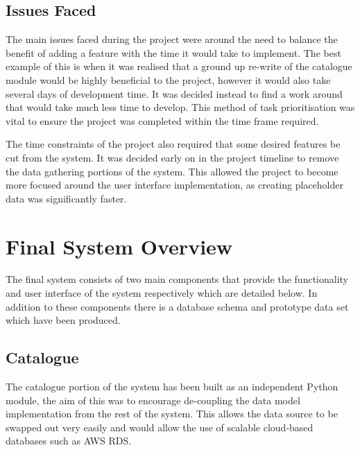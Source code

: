 \documentclass[12pt,titlepage]{article}
\begin{document}
  \subsection{Issues Faced}

  The main issues faced during the project were around the need to balance the
  benefit of adding a feature with the time it would take to implement. The best
  example of this is when it was realised that a ground up re-write of the
  catalogue module would be highly beneficial to the project, however it would
  also take several days of development time. It was decided instead to find a
  work around that would take much less time to develop. This method of task
  prioritisation was vital to ensure the project was completed within the
  time frame required.

  The time constraints of the project also required that some desired features
  be cut from the system. It was decided early on in the project timeline to
  remove the data gathering portions of the system. This allowed the project to
  become more focused around the user interface implementation, as creating
  placeholder data was significantly faster.

\section{Final System Overview}

  The final system consists of two main components that provide the
  functionality and user interface of the system respectively which are detailed
  below. In addition to these components there is a database schema and
  prototype data set which have been produced.

  \subsection{Catalogue}

  The catalogue portion of the system has been built as an independent Python
  module, the aim of this was to encourage de-coupling the data model
  implementation from the rest of the system. This allows the data source to be
  swapped out very easily and would allow the use of scalable cloud-based
  databases such as AWS RDS.
\end{document}
